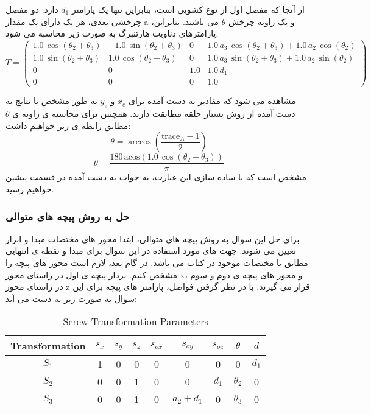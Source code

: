 از آنجا که مفصل اول از نوع کشویی است، بنابراین تنها یک پارامتر $d_1$ دارد. دو مفصل چرخشی بعدی، هر یک دارای یک مقدار a و یک زاویه چرخش $\theta$ می باشند. بنابراین، پارامترهای دناویت هارتنبرگ به صورت زیر محاسبه می شود:
\[
T = \left(\begin{array}{cccc}
	1.0\,\cos \left(\theta_2 +\theta_3 \right) & -1.0\,\sin \left(\theta_2 +\theta_3 \right) & 0 & 1.0\,a_3 \,\cos \left(\theta_2 +\theta_3 \right)+1.0\,a_2 \,\cos \left(\theta_2 \right)\\
	1.0\,\sin \left(\theta_2 +\theta_3 \right) & 1.0\,\cos \left(\theta_2 +\theta_3 \right) & 0 & 1.0\,a_3 \,\sin \left(\theta_2 +\theta_3 \right)+1.0\,a_2 \,\sin \left(\theta_2 \right)\\
	0 & 0 & 1.0 & 1.0\,d_1 \\
	0 & 0 & 0 & 1.0
\end{array}\right)
\]

مشاهده می شود که مقادیر به دست آمده برای $x_e$ و $y_e$ به طور مشخص با نتایج به دست آمده از روش بستار حلقه مطابقت دارند. 
همچنین برای محاسبه ی زاویه ی $\theta$ مطابق رابطه ی زیر خواهیم داشت:
\[
\theta = \arccos\left(\frac{\text{trace}_A - 1}{2}\right)  %
\]
\[
\theta = \frac{180\,\mathrm{acos}\left(1.0\,\cos \left(\theta_2 +\theta_3 \right)\right)}{\pi }
\]
مشخص است که با ساده سازی این عبارت، به جواب به دست آمده در قسمت پیشین خواهیم رسید.

 \subsubsection{حل به روش پیچه های متوالی}

برای حل این سوال به روش پیچه های متوالی، ابتدا محور های مختصات مبدا و ابزار تعیین می شوند. جهت های مورد استفاده در این سوال برای مبدا و نقطه ی انتهایی مطابق با مختصات موجود در کتاب می باشد.
در گام بعد، لازم است محور های پیچه را مشخص کنیم.
بردار پیچه ی اول در راستای محور x، و محور های پیچه ی دوم و سوم در راستای محور z قرار می گیرند. با در نظر گرفتن فواصل، پارامتر های پیچه برای این سوال به صورت زیر به دست می آید:

\begin{table}[h!]
	\centering
	\renewcommand{\arraystretch}{1.5}
	\begin{tabular}{|c|c|c|c|c|c|c|c|c|}
		\hline
		Transformation & \( s_x \) & \( s_y \) & \( s_z \) & \( s_{ox} \) & \( s_{oy} \) & \( s_{oz} \) & \( \theta \) & \( d \) \\ \hline
		\( S_1 \) & 1 & 0 & 0 & 0 & 0 & 0 & 0 & \( d_1 \) \\ \hline
		\( S_2 \) & 0 & 0 & 1 & 0 & 0 & \( d_1 \) & \( \theta_2 \) & 0 \\ \hline
		\( S_3 \) & 0 & 0 & 1 & 0 & \( a_2 + d_1 \) & 0 & \( \theta_3 \) & 0 \\ \hline
	\end{tabular}
	\caption{Screw Transformation Parameters}
\end{table}
 
